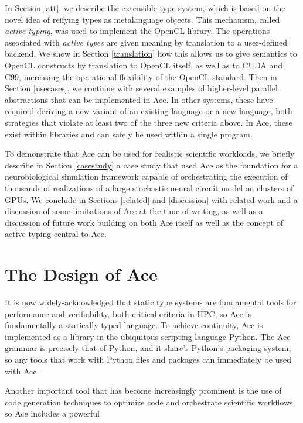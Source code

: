 \documentclass{sig-alternate}
\begin{document}
In Section \ref{att}, we describe the extensible type system, which is based on the novel idea of reifying types as metalanguage objects. This mechanism, called \emph{active typing}, was used to implement the OpenCL library. 
The operations associated with \emph{active types} are given meaning by translation to a user-defined backend. We show in Section \ref{translation} how this allows us to give semantics to OpenCL constructs by translation to OpenCL itself, as well as to CUDA and C99, increasing the operational flexibility of the OpenCL standard. Then in Section \ref{usecases}, we  continue with several examples of higher-level parallel abstractions that can be implemented in Ace. In other systems, these have required deriving a new variant of an existing language or a new language, both strategies that violate at least two of the three new criteria above. In Ace, these exist within libraries and can safely be used within a single program.

To demonstrate that Ace can be used for realistic scientific workloads, we briefly describe in Section \ref{casestudy} a case study that used Ace as the foundation for a neurobiological simulation framework capable of orchestrating the execution of thousands of realizations of a large stochastic neural circuit model on clusters of GPUs. 
We conclude in Sections \ref{related} and \ref{discussion} with related work and a discussion of some limitations of Ace at the time of writing, as well as a discussion of future work building on both Ace itself as well as the concept of active typing central to Ace.

\section{The Design of Ace}\label{highlevel}
It is now widely-acknowledged that static type systems are fundamental tools for performance and verifiability, both critical criteria in HPC, so Ace is fundamentally a statically-typed language. 
To achieve continuity, Ace is implemented as a library in the ubiquitous scripting language Python. The Ace grammar is precisely that of Python, and it share's Python's packaging system, so any tools that work with Python files and packages can immediately be used with Ace.

Another important tool that has become increasingly prominent is the use of code generation techniques to optimize code and orchestrate scientific workflows, so Ace includes a powerful  
\end{document}
